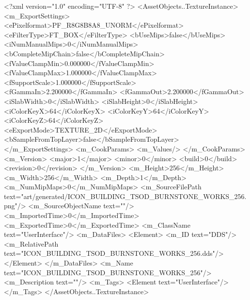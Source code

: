 <?xml version="1.0" encoding="UTF-8" ?>
<AssetObjects..TextureInstance>
	<m_ExportSettings>
		<ePixelformat>PF_R8G8B8A8_UNORM</ePixelformat>
		<eFilterType>FT_BOX</eFilterType>
		<bUseMips>false</bUseMips>
		<iNumManualMips>0</iNumManualMips>
		<bCompleteMipChain>false</bCompleteMipChain>
		<fValueClampMin>0.000000</fValueClampMin>
		<fValueClampMax>1.000000</fValueClampMax>
		<fSupportScale>1.000000</fSupportScale>
		<fGammaIn>2.200000</fGammaIn>
		<fGammaOut>2.200000</fGammaOut>
		<iSlabWidth>0</iSlabWidth>
		<iSlabHeight>0</iSlabHeight>
		<iColorKeyX>64</iColorKeyX>
		<iColorKeyY>64</iColorKeyY>
		<iColorKeyZ>64</iColorKeyZ>
		<eExportMode>TEXTURE_2D</eExportMode>
		<bSampleFromTopLayer>false</bSampleFromTopLayer>
	</m_ExportSettings>
	<m_CookParams>
		<m_Values/>
	</m_CookParams>
	<m_Version>
		<major>1</major>
		<minor>0</minor>
		<build>0</build>
		<revision>0</revision>
	</m_Version>
	<m_Height>256</m_Height>
	<m_Width>256</m_Width>
	<m_Depth>1</m_Depth>
	<m_NumMipMaps>0</m_NumMipMaps>
	<m_SourceFilePath text="art/generated/ICON_BUILDING_TSOD_BURNSTONE_WORKS_256.png"/>
	<m_SourceObjectName text=""/>
	<m_ImportedTime>0</m_ImportedTime>
	<m_ExportedTime>0</m_ExportedTime>
	<m_ClassName text="UserInterface"/>
	<m_DataFiles>
		<Element>
			<m_ID text="DDS"/>
			<m_RelativePath text="ICON_BUILDING_TSOD_BURNSTONE_WORKS_256.dds"/>
		</Element>
	</m_DataFiles>
	<m_Name text="ICON_BUILDING_TSOD_BURNSTONE_WORKS_256"/>
	<m_Description text=""/>
	<m_Tags>
		<Element text="UserInterface"/>
	</m_Tags>
</AssetObjects..TextureInstance>
